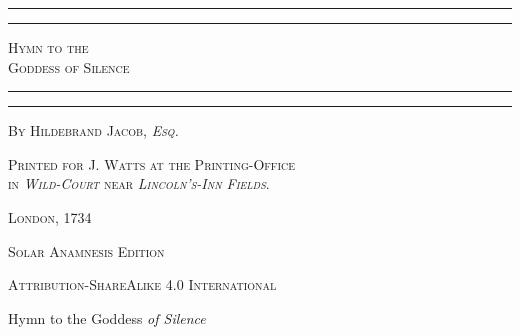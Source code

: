 \documentclass[a4paper, 11pt, oneside]{article}
\begin{document}
\begin{titlepage} %
	\centering %

	
	\rule{\textwidth}{1.6pt}\vspace*{-\baselineskip}\vspace*{2pt} %
	\rule{\textwidth}{0.4pt} %
	
	{\scshape\LARGE Hymn to the \\ Goddess of Silence}
	
	\rule{\textwidth}{0.4pt}\vspace*{-\baselineskip}\vspace{3.2pt} %
	\rule{\textwidth}{1.6pt} %

	
	\vspace{1\baselineskip}
	
	{\scshape By \Large Hildebrand Jacob, \emph{Esq.}} %
	





	
	


\vspace*{\fill}

	\vspace{1\baselineskip}

	{\footnotesize\scshape Printed for J. Watts at the Printing-Office \\ in \emph{Wild-Court} near \emph{Lincoln's-Inn Fields}.}
	
	{\small\scshape{London, 1734}}
	
	\vspace{0.5\baselineskip} %



\scshape Solar Anamnesis Edition
	
	{\scshape\small Attribution-ShareAlike 4.0 International} %
\end{titlepage}
\setlength{\parskip}{1mm plus1mm minus1mm}
\setcounter{tocdepth}{3}
\setcounter{secnumdepth}{3}
\clearpage
\begin{center}
Hymn to the Goddess \emph{of Silence}
\end{center}
\end{document}
